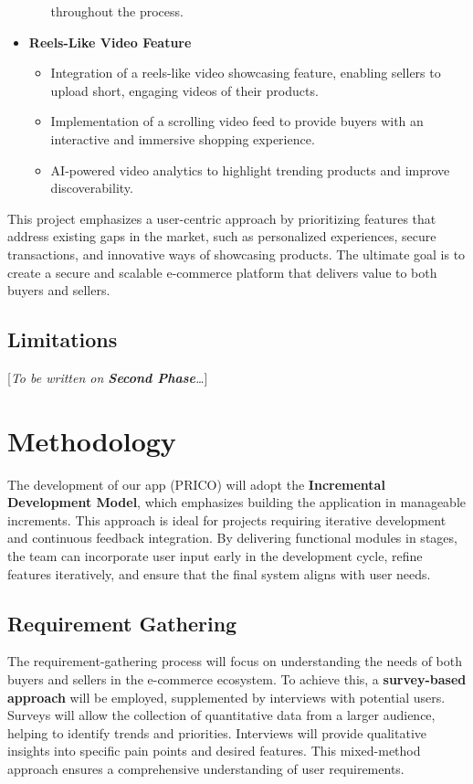 \documentclass[12pt]{report}
\begin{document}
\begin{itemize}
\begin{itemize}
		            throughout the process.
	      \end{itemize}
	\item \textbf{Reels-Like Video Feature}
	      \begin{itemize}
		      \item Integration of a reels-like video showcasing feature, enabling sellers to upload
		            short, engaging videos of their products.
		      \item Implementation of a scrolling video feed to provide buyers with an interactive
		            and immersive shopping experience.
		      \item AI-powered video analytics to highlight trending products and improve
		            discoverability.
	      \end{itemize}
\end{itemize}

This project emphasizes a user-centric approach by prioritizing features that address existing
gaps in the market, such as personalized experiences, secure transactions, and innovative
ways of showcasing products. The ultimate goal is to create a secure and scalable
e-commerce platform that delivers value to both buyers and sellers.

\subsection{Limitations}

[\textit{To be written on \textbf{Second Phase}\dots}]

\section{Methodology}

The development of our app (PRICO) will adopt the \textbf{Incremental Development Model},
which emphasizes building the application in manageable increments. This approach is ideal
for projects requiring iterative development and continuous feedback integration. By
delivering functional modules in stages, the team can incorporate user input early in the
development cycle, refine features iteratively, and ensure that the final system aligns with
user needs. \cite{c8}

\subsection{Requirement Gathering}

The requirement-gathering process will focus on understanding the needs of both buyers and
sellers in the e-commerce ecosystem. To achieve this, a \textbf{survey-based approach} will be
employed, supplemented by interviews with potential users. Surveys will allow the collection
of quantitative data from a larger audience, helping to identify trends and priorities.
Interviews will provide qualitative insights into specific pain points and desired features. This
mixed-method approach ensures a comprehensive understanding of user requirements.
\end{document}
